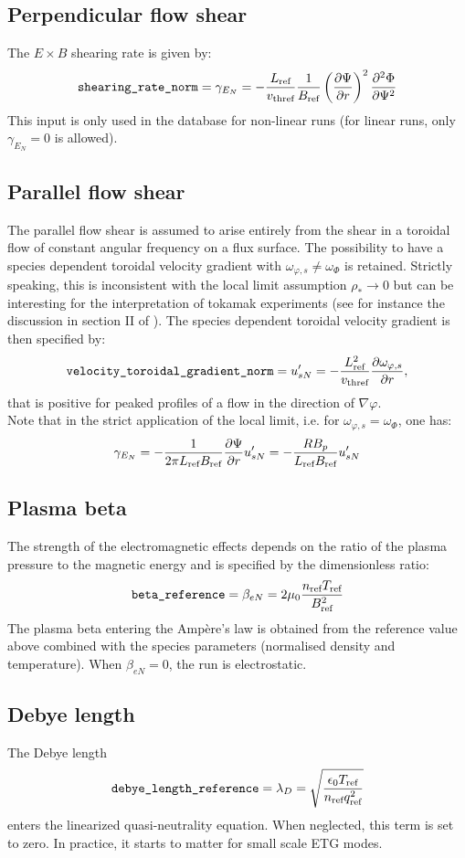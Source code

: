 \documentclass[a4paper]{report}
\begin{document}
\subsection{Perpendicular flow shear} \label{sec:exb}
The $E\times B$ shearing rate is given by:
$$\texttt{shearing\_rate\_norm}=\gamma_{E_N}=-\frac{L_{\textrm{ref}}}{v_\textrm{thref}}\frac{1}{B_{\textrm{ref}}}\left(\frac{\partial \Psi}{\partial r}\right)^2\frac{\partial^2 \Phi}{\partial \Psi^2}$$
This input is only used in the database for non-linear runs (for linear runs, only $\gamma_{E_N}=0$ is allowed).
\subsection{Parallel flow shear} \label{sec:dvdr}
The parallel flow shear is assumed to arise entirely from the shear in a toroidal flow of constant angular frequency on a flux surface. The possibility to have a species dependent toroidal velocity gradient with $\omega_{\varphi,s}\neq \omega_\Phi$ is retained. Strictly speaking, this is inconsistent with the local limit assumption $\rho_*\rightarrow 0$ but can be interesting for the interpretation of tokamak experiments (see for instance the discussion in section II of \cite{Camenen:PoP2016}). The species dependent toroidal velocity gradient is then specified by: 
$$\texttt{velocity\_toroidal\_gradient\_norm}=u'_{sN}=-\frac{L_{\textrm{ref}}^2}{v_\textrm{thref}}\frac{\partial \omega_{\varphi,s}}{\partial r},$$
that is positive for peaked profiles of a flow in the direction of $\nabla \varphi$.\\
Note that in the strict application of the local limit, i.e. for $\omega_{\varphi,s}=\omega_\Phi$, one has:
$$\gamma_{E_N}= - \frac{1}{2\pi L_{\textrm{ref}} B_{\textrm{ref}}}\frac{\partial \Psi}{\partial r} u'_{sN} = - \frac{RB_p}{L_{\textrm{ref}} B_{\textrm{ref}}} u'_{sN}$$
\subsection{Plasma beta} \label{em:beta}
The strength of the electromagnetic effects depends on the ratio of the plasma pressure to the magnetic energy and is specified by the dimensionless ratio:
\begin{equation}
\texttt{beta\_reference}=\beta_{eN} = 2\mu_0 \frac{n_{\textrm{ref}} T_{\textrm{ref}}}{B_{\textrm{ref}}^2}
\end{equation}
The plasma beta entering the Amp\`ere's law is obtained from the reference value above combined with the species parameters (normalised density and temperature).
When $\beta_{eN}=0$, the run is electrostatic. 
\subsection{Debye length} \label{sec:debye}
The Debye length
\begin{equation}
\texttt{debye\_length\_reference}=\lambda_{D}= \sqrt{\frac{\epsilon_0 T_{\textrm{ref}}}{n_{\textrm{ref}} q_{\textrm{ref}}^2}}
\end{equation}
enters the linearized quasi-neutrality equation. When neglected, this term is set to zero. In practice, it starts to matter for small scale ETG modes. 
\end{document}

